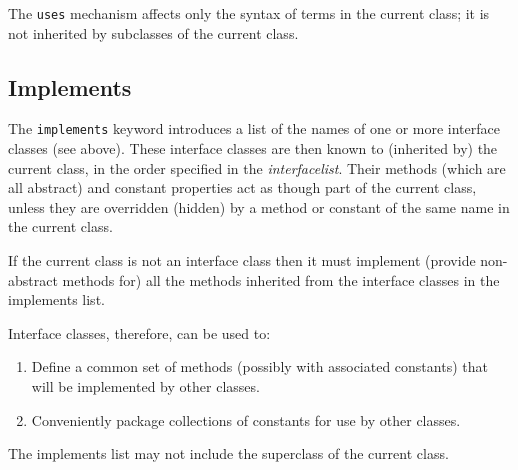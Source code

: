 The \texttt{uses} mechanism affects only the syntax of terms in the
current class; it is not inherited by subclasses of the current class.
\subsection{Implements}
 
The \texttt{implements} keyword introduces a list of the names of one or
more interface classes (see above).
These interface classes are then known to (inherited by) the current
class, in the order specified in the \emph{interfacelist}.
Their methods (which are all abstract) and constant properties act as
though part of the current class, unless they are overridden (hidden) by
a method or constant of the same name in the current class.
 
If the current class is not an interface class then it must implement
(provide non-abstract methods for) all the methods inherited from the
interface classes in the implements list.
 
Interface classes, therefore, can be used to:
\begin{enumerate}
\item Define a common set of methods (possibly with associated constants)
that will be implemented by other classes.
\item Conveniently package collections of constants for use by other
classes.
\end{enumerate}
 
The implements list may not include the superclass of the current class.
\index{,}
